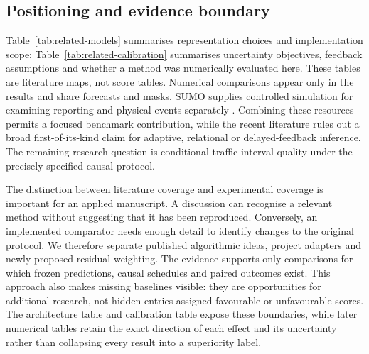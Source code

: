 \subsection{Positioning and evidence boundary}
Table~\ref{tab:related-models} summarises representation choices and implementation scope; Table~\ref{tab:related-calibration} summarises uncertainty objectives, feedback assumptions and whether a method was numerically evaluated here. These tables are literature maps, not score tables. Numerical comparisons appear only in the results and share forecasts and masks. SUMO supplies controlled simulation for examining reporting and physical events separately \citep{lopez2018}. Combining these resources permits a focused benchmark contribution, while the recent literature rules out a broad first-of-its-kind claim for adaptive, relational or delayed-feedback inference. The remaining research question is conditional traffic interval quality under the precisely specified causal protocol.

The distinction between literature coverage and experimental coverage is important for an applied manuscript. A discussion can recognise a relevant method without suggesting that it has been reproduced. Conversely, an implemented comparator needs enough detail to identify changes to the original protocol. We therefore separate published algorithmic ideas, project adapters and newly proposed residual weighting. The evidence supports only comparisons for which frozen predictions, causal schedules and paired outcomes exist. This approach also makes missing baselines visible: they are opportunities for additional research, not hidden entries assigned favourable or unfavourable scores. The architecture table and calibration table expose these boundaries, while later numerical tables retain the exact direction of each effect and its uncertainty rather than collapsing every result into a superiority label.
